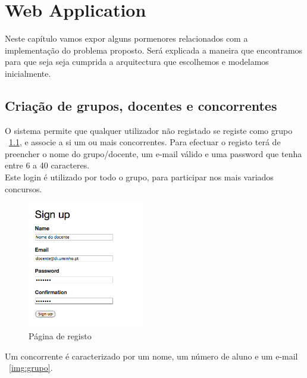 \chapter{Web Application} \label{chap webApp}
\minitoc
Neste capítulo vamos expor alguns pormenores relacionados com a implementação do problema proposto.
Será explicada a maneira que encontramos para que seja seja cumprida a arquitectura que escolhemos e modelamos inicialmente.

\section{Criação de grupos, docentes e concorrentes}\label{sec gdc}
O sistema permite que qualquer utilizador não registado se registe como grupo ~\ref{img:signup}, e associe a si um ou mais concorrentes. Para efectuar o registo terá de preencher o nome do grupo/docente, um e-mail válido e uma password que tenha entre 6 a 40 caracteres.\\
Este login é utilizado por todo o grupo, para participar nos mais variados concursos.\\

\begin{figure}[H]
\begin{center}
\includegraphics[width=0.45\textwidth]{Images/signup}
\caption{Página de registo}\label{img:signup}
\end{center}
\end{figure} 

Um concorrente é caracterizado por um nome, um número de aluno e um e-mail ~\ref{img:grupo}.

